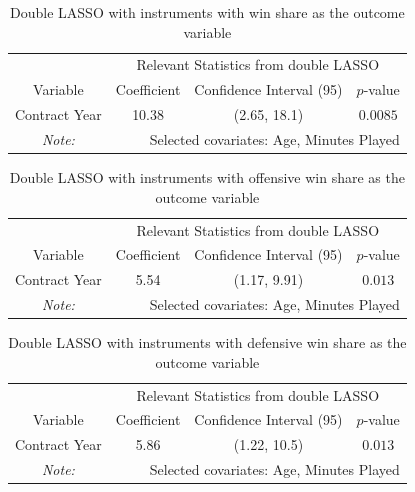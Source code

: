 \documentclass[12pt]{article}
\begin{document}
	\begin{table}[!htbp]
		\centering
		\caption{Double LASSO with instruments with win share as the outcome variable}
		\label{lassoivws} 
		\begin{tabular}{*4c}
			\toprule
			& \multicolumn{3}{c}{Relevant Statistics from double LASSO} \\
			\cmidrule(lr){2-4}
			Variable & Coefficient  & Confidence Interval (95) & $p$-value \\
			\midrule
			Contract Year & 10.38       & (2.65, 18.1) & $0.0085$       \\
			\bottomrule
			\textit{Note:}  & \multicolumn{3}{r}{Selected covariates: Age, Minutes Played} \\ 
		\end{tabular}
	\end{table}
	
	\begin{table}[!htbp]
		\centering
		\caption{Double LASSO with instruments with offensive win share as the outcome variable}
		\label{lassoivows} 
		\begin{tabular}{*4c}
			\toprule
			& \multicolumn{3}{c}{Relevant Statistics from double LASSO} \\
			\cmidrule(lr){2-4}
			Variable & Coefficient  & Confidence Interval (95) & $p$-value \\
			\midrule
			Contract Year & 5.54       & (1.17, 9.91) & $0.013$       \\
			\bottomrule
			\textit{Note:}  & \multicolumn{3}{r}{Selected covariates: Age, Minutes Played} \\
		\end{tabular}
	\end{table}
	
	\begin{table}[!htbp]
		\centering
		\caption{Double LASSO with instruments with defensive win share as the outcome variable}
		\label{lassoivdws} 
		\begin{tabular}{*4c}
			\toprule
			& \multicolumn{3}{c}{Relevant Statistics from double LASSO} \\
			\cmidrule(lr){2-4}
			Variable & Coefficient  & Confidence Interval (95) & $p$-value \\
			\midrule
			Contract Year & 5.86       & (1.22, 10.5) & $0.013$       \\
			\bottomrule
			\textit{Note:}  & \multicolumn{3}{r}{Selected covariates: Age, Minutes Played} \\
		\end{tabular}
	\end{table}
	
\end{document}
